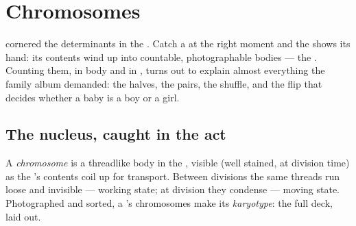\chapter{Chromosomes}\label{ch:g9:chromosomes}

 cornered the
determinants in the . Catch a  at the right
moment and the  shows its hand: its contents wind up
into countable, photographable bodies --- the .
Counting them, in body  and in , turns out to
explain almost everything the family album demanded: the
halves, the pairs, the shuffle, and the flip that decides
whether a baby is a boy or a girl.

\section{The nucleus, caught in the act}

\begin{definition}[Chromosomes]\label{def:g9:chromosomes:chromosomes}
A \emph{chromosome} is a threadlike body
in the , visible (well stained, at division time)
as the 's contents coil up for transport. Between
divisions the same threads run loose and invisible ---
working state; at division they condense --- moving state.
Photographed and sorted, a 's chromosomes make its
\emph{karyotype}: the full deck, laid
out.
\end{definition}

